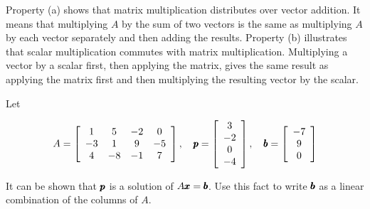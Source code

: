 Property (a) shows that matrix multiplication distributes over vector addition. It means that multiplying \( A \) by the sum of two vectors is the same as multiplying \( A \) by each vector separately and then adding the results.     Property (b) illustrates that scalar multiplication commutes with matrix multiplication. Multiplying a vector by a scalar first, then applying the matrix, gives the same result as applying the matrix first and then multiplying the resulting vector by the scalar.

\begin{example} Let

\[
A = \left[\begin{array}{cccc}
1 & 5 & -2 & 0 \\
-3 & 1 & 9 & -5 \\
4 & -8 & -1 & 7
\end{array}\right], \quad \pmb{p} = \left[\begin{array}{c}
3 \\
-2 \\
0 \\
-4
\end{array}\right], \quad \pmb{b} = \left[\begin{array}{c}
-7 \\
9 \\
0
\end{array}\right]
\]

It can be shown that $\pmb{p}$ is a solution of $A \pmb{x} = \pmb{b}$. Use this fact to write $\pmb{b}$ as a linear combination of the columns of $A$.
    
\end{example}  

